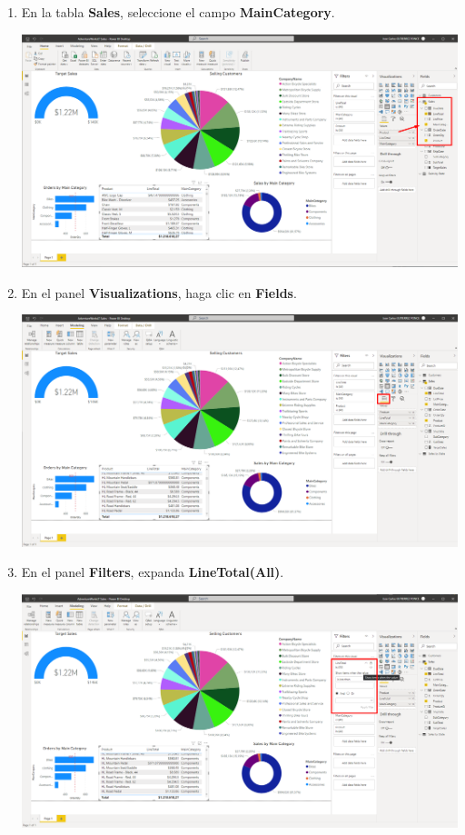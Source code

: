\documentclass[12pt,letterpaper]{article}
\newcommand\tab[1][1cm]{\hspace*{#1}}
\begin{document}
\begin{enumerate}[\tab 1.]
\begin{center}
        \end{center}
        \item En la tabla \textbf{Sales}, seleccione el campo \textbf{MainCategory}.
        \begin{center}
            \includegraphics[width=13cm]{./img/img105.png}
        \end{center}
        \item En el panel \textbf{Visualizations}, haga clic en \textbf{Fields}.
        \begin{center}
            \includegraphics[width=13cm]{./img/img106.png}
        \end{center}
        \item En el panel \textbf{Filters}, expanda \textbf{LineTotal(All)}.
        \begin{center}
            \includegraphics[width=13cm]{./img/img107.png}

\end{center}
\end{enumerate}
\end{document}
